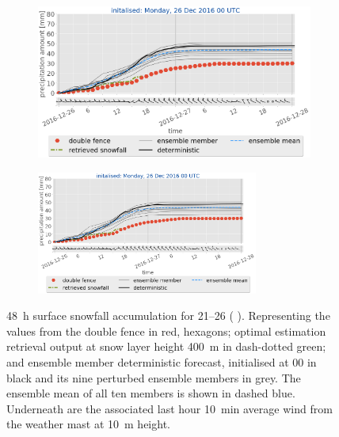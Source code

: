 \begin{figure}[t!]
\begin{subfigure}[t]{0.49\textwidth}
		\caption{}\label{fig:sfc_acc25}
	\end{subfigure}
	\begin{subfigure}[t]{0.49\textwidth}	\includegraphics[trim={0.cm 3.6cm 0.cm 0cm},clip,width=\textwidth]{./fig_sfc_acc/acc_wind_20161226_00}
		\caption{}\label{fig:sfc_acc26}
	\end{subfigure}
	
	\begin{subfigure}[t]{\textwidth}
		\centering
		\includegraphics[trim={1.2cm 0cm 1.1cm 21.4cm},clip,width=0.8\textwidth]{./fig_sfc_acc/acc_wind_20161226_00}
	\end{subfigure}
	\caption{\SI{48}{\hour} surface snowfall accumulation for \SIrange{21}{26}{\dec} (\protect{}  \protect{}). Representing the values from the double fence in red, hexagons; optimal estimation retrieval output at snow layer height \SI{400}{\metre} in dash-dotted green; and ensemble member deterministic forecast, initialised at \SI{00}{\UTC} in black and its nine perturbed ensemble members in grey. The ensemble mean of all ten members is shown in dashed blue. Underneath are the associated last hour \SI{10}{\minute} average wind from the weather mast at \SI{10}{\metre} height. }\label{fig:sfc_acc}
\end{figure}
